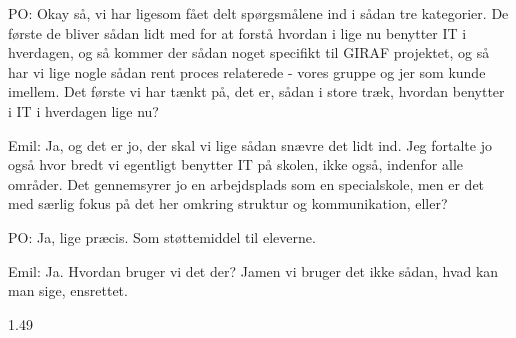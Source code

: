 PO:
Okay så, vi har ligesom fået delt spørgsmålene ind i sådan tre kategorier. 
De første de bliver sådan lidt med for at forstå hvordan i lige nu benytter IT i hverdagen, og så kommer der sådan noget specifikt til GIRAF projektet, og så har vi lige nogle sådan rent proces relaterede - vores gruppe og jer som kunde imellem.
Det første vi har tænkt på, det er, sådan i store træk, hvordan benytter i IT i hverdagen lige nu?   

Emil: 
Ja, og det er jo, der skal vi lige sådan snævre det lidt ind. 
Jeg fortalte jo også hvor bredt vi egentligt benytter IT på skolen, ikke også, indenfor alle områder. 
Det gennemsyrer jo en arbejdsplads som en specialskole, men er det med særlig fokus på det her omkring struktur og kommunikation, eller?

PO: 
Ja, lige præcis.
Som støttemiddel til eleverne.

Emil:
Ja.
Hvordan bruger vi det der?
Jamen vi bruger det ikke sådan, hvad kan man sige, ensrettet.

1.49



